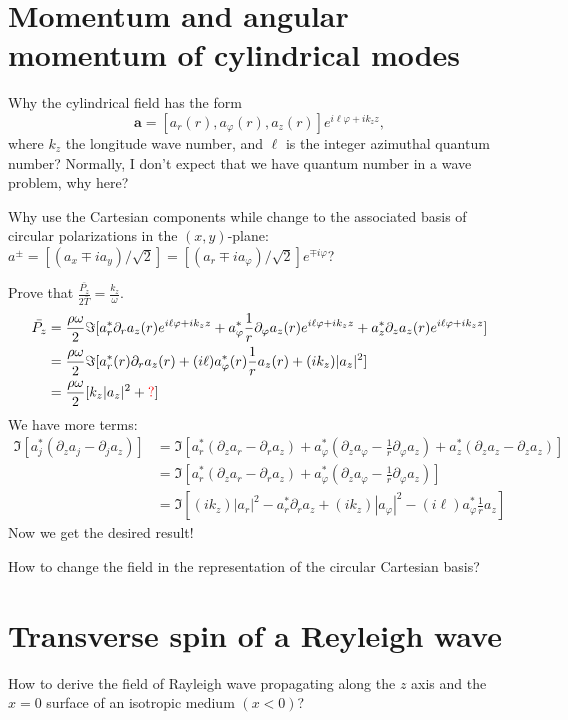 \section{Momentum and angular momentum of cylindrical modes}
Why the cylindrical field has the form
$$
\boldsymbol{a}=[a_r(r),a_{\varphi}(r),a_z(r)]e^{i\ell\varphi+ik_zz},
$$
where $k_z$ the longitude wave number, and $\ell$ is the integer azimuthal quantum number? Normally, I don't expect that we have quantum number in a wave problem, why here?

Why use the Cartesian components while change to the associated basis of circular polarizations in the $(x,y)$-plane: $a^{\pm}=[(a_x\mp ia_y)/\sqrt{2}]=[(a_r\mp ia_{\varphi})/\sqrt{2}]e^{\mp i\varphi}$?

Prove that $\frac{\bar{P_z}}{2\bar{T}}=\frac{k_z}{\omega}$.
$$
\begin{aligned}
\bar{P_z}&=\frac{\rho\omega}{2}\Im[a_r^{*}\partial_ra_z(r)e^{i\ell \varphi+ik_zz}+a_{\varphi}^{*}\frac{1}{r}\partial_{\varphi}a_z(r)e^{i\ell \varphi+ik_zz}+a_z^{*}\partial_za_z(r)e^{i\ell \varphi+ik_zz}]\\
&=\frac{\rho\omega}{2}\Im[a_r^{*}(r)\partial_ra_z(r)+(i\ell)a_{\varphi}^{*}(r)\frac{1}{r}a_z(r)+(ik_z)|a_z|^{2}]\\
&=\frac{\rho\omega}{2}[k_z|a_z|^2+{\color{red}?}]
\end{aligned}
$$
We have more terms:
$$
\begin{aligned}
\Im[a_{j}^{*}(\partial_za_j-\partial_ja_z)]&=\Im[a_{r}^{*}(\partial_z a_r-\partial_r a_z)+a_{\varphi}^{*}(\partial_z a_{\varphi}-\frac{1}{r}\partial_\varphi a_z)+a_{z}^{*}(\partial_z a_z-\partial_z a_z)]\\
&=\Im[a_{r}^{*}(\partial_z a_r-\partial_r a_z)+a_{\varphi}^{*}(\partial_z a_{\varphi}-\frac{1}{r}\partial_\varphi a_z)]\\
&=\Im[(ik_z)|a_r|^2-a^{*}_{r}\partial_ra_z+(ik_z)|a_{\varphi}|^2-(i\ell)a_{\varphi}^{*}\frac{1}{r}a_z]
\end{aligned}
$$
Now we get the desired result!

How to change the field in the representation of the circular Cartesian basis?

\section{Transverse spin of a Reyleigh wave}
How to derive the field of Rayleigh wave propagating along the $z$ axis and the $x=0$ surface of an isotropic medium $(x<0)$?